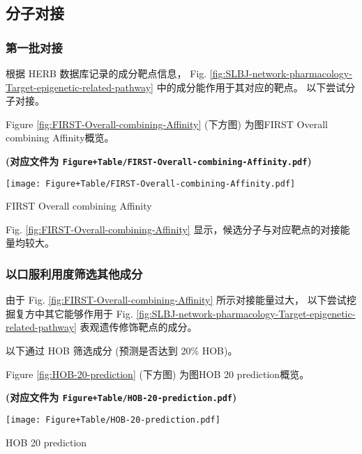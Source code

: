 \documentclass[
]{article}
\begin{document}
\hypertarget{ux5206ux5b50ux5bf9ux63a5}{%
\subsection{分子对接}\label{ux5206ux5b50ux5bf9ux63a5}}

\hypertarget{ux7b2cux4e00ux6279ux5bf9ux63a5}{%
\subsubsection{第一批对接}\label{ux7b2cux4e00ux6279ux5bf9ux63a5}}

根据 HERB 数据库记录的成分靶点信息，
Fig. \ref{fig:SLBJ-network-pharmacology-Target-epigenetic-related-pathway}
中的成分能作用于其对应的靶点。
以下尝试分子对接。

Figure \ref{fig:FIRST-Overall-combining-Affinity} (下方图) 为图FIRST Overall combining Affinity概览。

\textbf{(对应文件为 \texttt{Figure+Table/FIRST-Overall-combining-Affinity.pdf})}

\def\@captype{figure}
\begin{center}
\texttt{[image: Figure+Table/FIRST-Overall-combining-Affinity.pdf]}
\caption{FIRST Overall combining Affinity}\label{fig:FIRST-Overall-combining-Affinity}
\end{center}

Fig. \ref{fig:FIRST-Overall-combining-Affinity} 显示，候选分子与对应靶点的对接能量均较大。

\hypertarget{ux4ee5ux53e3ux670dux5229ux7528ux5ea6ux7b5bux9009ux5176ux4ed6ux6210ux5206}{%
\subsubsection{以口服利用度筛选其他成分}\label{ux4ee5ux53e3ux670dux5229ux7528ux5ea6ux7b5bux9009ux5176ux4ed6ux6210ux5206}}

由于 Fig. \ref{fig:FIRST-Overall-combining-Affinity} 所示对接能量过大，
以下尝试挖掘复方中其它能够作用于 Fig. \ref{fig:SLBJ-network-pharmacology-Target-epigenetic-related-pathway}
表观遗传修饰靶点的成分。

以下通过 HOB 筛选成分 (预测是否达到 20\% HOB)。

Figure \ref{fig:HOB-20-prediction} (下方图) 为图HOB 20 prediction概览。

\textbf{(对应文件为 \texttt{Figure+Table/HOB-20-prediction.pdf})}

\def\@captype{figure}
\begin{center}
\texttt{[image: Figure+Table/HOB-20-prediction.pdf]}
\caption{HOB 20 prediction}\label{fig:HOB-20-prediction}
\end{center}
\end{document}
